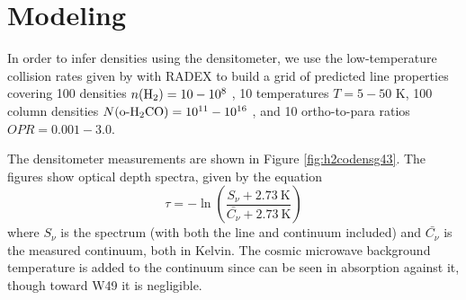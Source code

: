 \section{Modeling \formaldehyde}
In order to infer densities using the \formaldehyde densitometer, we use the
low-temperature collision rates given by \citet{Troscompt2009a} with RADEX
\citep{van-der-Tak2007a} to build a grid of predicted line properties covering
100 densities $n(\textrm{H}_{2}) = 10-10^8$ \percc, 10 temperatures $T=5-50$ K, 100 column densities
$N(\textrm{o-H}_2\textrm{CO}) = 10^{11}-10^{16}$ \persc, and 10 ortho-to-para ratios 
$OPR = 0.001-3.0$.

The \formaldehyde densitometer measurements are shown in Figure \ref{fig:h2codensg43}.
The figures show optical depth spectra, given by the equation
\begin{equation}
    \tau = -\ln\left(\frac{S_\nu + 2.73\mathrm{~K}}{\bar{C_\nu} + 2.73\mathrm{~K}}\right)
\end{equation}
where $S_\nu$ is the spectrum (with both the line and continuum included) and $\bar{C_\nu}$ is
the measured continuum, both in Kelvin.  The cosmic microwave background
temperature is added to the continuum since \formaldehyde can be seen in
absorption against it, though toward W49 it is negligible.


